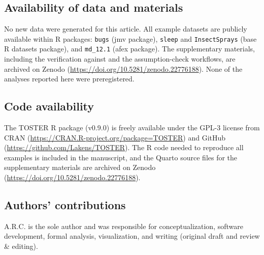 \documentclass[]{interact}
\theoremstyle{plain}%
\theoremstyle{definition}
\theoremstyle{remark}
\begin{document}
\subsection*{Availability of data and
materials}\label{availability-of-data-and-materials}

No new data were generated for this article. All example datasets are
publicly available within R packages: \texttt{bugs} (jmv package),
\texttt{sleep} and \texttt{InsectSprays} (base R datasets package), and
\texttt{md\_12.1} (afex package). The supplementary materials, including
the verification against \citet{Campbell_2021} and the assumption-check
workflows, are archived on Zenodo
(\url{https://doi.org/10.5281/zenodo.22776188}). None of the analyses
reported here were preregistered.

\subsection*{Code availability}\label{code-availability}

The TOSTER R package (v0.9.0) is freely available under the GPL-3
license from CRAN (\url{https://CRAN.R-project.org/package=TOSTER}) and
GitHub (\url{https://github.com/Lakens/TOSTER}). The R code needed to
reproduce all examples is included in the manuscript, and the Quarto
source files for the supplementary materials are archived on Zenodo
(\url{https://doi.org/10.5281/zenodo.22776188}).

\subsection*{Authors' contributions}\label{authors-contributions}

A.R.C. is the sole author and was responsible for conceptualization,
software development, formal analysis, visualization, and writing
(original draft and review \& editing).

\newpage



\end{document}
